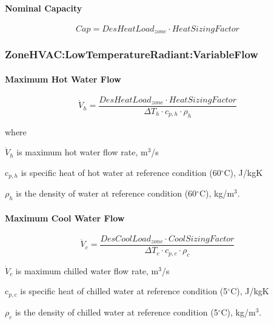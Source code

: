\paragraph{Nominal Capacity}\label{nominal-capacity-1}

\begin{equation}
Cap = DesHeatLoa{d_{zone}} \cdot HeatSizingFactor
\end{equation}

\subsubsection{ZoneHVAC:LowTemperatureRadiant:VariableFlow}\label{zonehvaclowtemperatureradiantvariableflow}

\paragraph{Maximum Hot Water Flow}\label{maximum-hot-water-flow-1}

\begin{equation}
{\dot V_h} = \frac{{DesHeatLoa{d_{zone}} \cdot HeatSizingFactor}}{{\Delta {T_h} \cdot {c_{p,h}} \cdot {\rho_h}}}
\end{equation}

where

\({\dot V_h}\) is maximum hot water flow rate, m\(^{3}\)/s

c\(_{p,h}\) is specific heat of hot water at reference condition (60\(^{\circ}\)C), J/kgK

\(\rho_{h}\) is the density of water at reference condition (60\(^{\circ}\)C), kg/m\(^{3}\).

\paragraph{Maximum Cool Water Flow}\label{maximum-cool-water-flow}

\begin{equation}
{\dot V_c} = \frac{{DesCoolLoa{d_{zone}} \cdot CoolSizingFactor}}{{\Delta {T_c} \cdot {c_{p,c}} \cdot {\rho_c}}}
\end{equation}

\({\dot V_c}\) is maximum chilled water flow rate, m\(^{3}\)/s

c\(_{p,c}\) is specific heat of chilled water at reference condition (5\(^{\circ}\)C), J/kgK

\(\rho_{c}\) is the density of chilled water at reference condition (5\(^{\circ}\)C), kg/m\(^{3}\).

